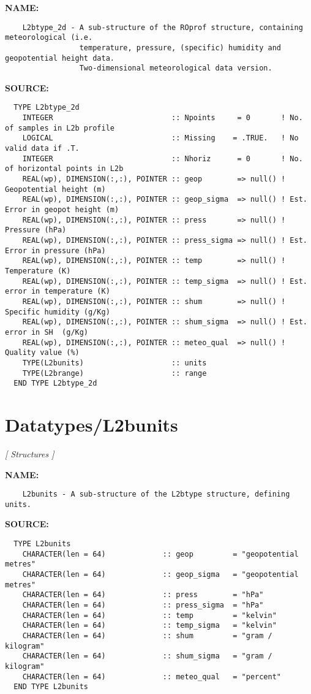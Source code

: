 \label{ch:robo42}
\label{ch:Datatypes_L2btype_2d}
\textbf{NAME:}\hspace{0.08in}\begin{Verbatim}
    L2btype_2d - A sub-structure of the ROprof structure, containing meteorological (i.e.
                 temperature, pressure, (specific) humidity and geopotential height data.
                 Two-dimensional meteorological data version.
\end{Verbatim}
\textbf{SOURCE:}\hspace{0.08in}\begin{Verbatim}
  TYPE L2btype_2d
    INTEGER                           :: Npoints     = 0       ! No. of samples in L2b profile
    LOGICAL                           :: Missing    = .TRUE.   ! No valid data if .T.
    INTEGER                           :: Nhoriz      = 0       ! No. of horizontal points in L2b
    REAL(wp), DIMENSION(:,:), POINTER :: geop        => null() ! Geopotential height (m)
    REAL(wp), DIMENSION(:,:), POINTER :: geop_sigma  => null() ! Est. Error in geopot height (m)
    REAL(wp), DIMENSION(:,:), POINTER :: press       => null() ! Pressure (hPa)
    REAL(wp), DIMENSION(:,:), POINTER :: press_sigma => null() ! Est. Error in pressure (hPa)
    REAL(wp), DIMENSION(:,:), POINTER :: temp        => null() ! Temperature (K)
    REAL(wp), DIMENSION(:,:), POINTER :: temp_sigma  => null() ! Est. error in temperature (K)
    REAL(wp), DIMENSION(:,:), POINTER :: shum        => null() ! Specific humidity (g/Kg)
    REAL(wp), DIMENSION(:,:), POINTER :: shum_sigma  => null() ! Est. error in SH  (g/Kg)
    REAL(wp), DIMENSION(:,:), POINTER :: meteo_qual  => null() ! Quality value (%)
    TYPE(L2bunits)                    :: units
    TYPE(L2brange)                    :: range
  END TYPE L2btype_2d
\end{Verbatim}
\section{Datatypes/L2bunits}
\textsl{[ Structures ]}

\label{ch:robo43}
\label{ch:Datatypes_L2bunits}
\textbf{NAME:}\hspace{0.08in}\begin{Verbatim}
    L2bunits - A sub-structure of the L2btype structure, defining units.
\end{Verbatim}
\textbf{SOURCE:}\hspace{0.08in}\begin{Verbatim}
  TYPE L2bunits
    CHARACTER(len = 64)             :: geop         = "geopotential metres"
    CHARACTER(len = 64)             :: geop_sigma   = "geopotential metres"
    CHARACTER(len = 64)             :: press        = "hPa"
    CHARACTER(len = 64)             :: press_sigma  = "hPa"
    CHARACTER(len = 64)             :: temp         = "kelvin"
    CHARACTER(len = 64)             :: temp_sigma   = "kelvin"
    CHARACTER(len = 64)             :: shum         = "gram / kilogram"
    CHARACTER(len = 64)             :: shum_sigma   = "gram / kilogram"
    CHARACTER(len = 64)             :: meteo_qual   = "percent"
  END TYPE L2bunits
\end{Verbatim}
